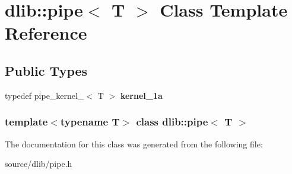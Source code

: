 \hypertarget{classdlib_1_1pipe}{
\section{dlib::pipe$<$ T $>$ Class Template Reference}
\label{classdlib_1_1pipe}
}
\subsection*{Public Types}
\begin{DoxyCompactItemize}
\item 
\hypertarget{classdlib_1_1pipe_a4bf0a8af96d3862476be943867b52c2d}{
typedef pipe\_\-kernel\_$<$ T $>$ {\bfseries kernel\_\-1a}}
\label{classdlib_1_1pipe_a4bf0a8af96d3862476be943867b52c2d}

\end{DoxyCompactItemize}
\subsubsection*{template$<$typename T$>$ class dlib::pipe$<$ T $>$}



The documentation for this class was generated from the following file:\begin{DoxyCompactItemize}
\item 
source/dlib/pipe.h\end{DoxyCompactItemize}
